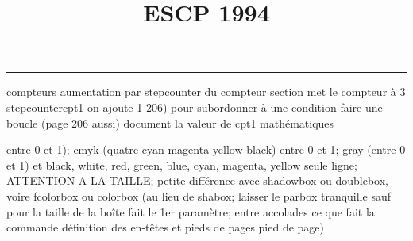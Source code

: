 \documentclass[11pt]{article}%
\title{\bf \vspace{-2cm} ESCP 1994} %
\author{} %
\date{} %
\renewcommand{\headrulewidth}{0pt}%
\renewcommand{\footrulewidth}{0.4pt}%
\begin{document}
\maketitle %
\vspace{-1.4cm}\hrule %
\thispagestyle{fancy}

\vspace*{.2cm}



compteurs%
aumentation par stepcounter du compteur section%
met le compteur à 3%
stepcounter{cpt1} on ajoute 1%
206) pour subordonner à une condition %
faire une boucle (page 206 aussi) %
document la valeur de cpt1 
mathématiques\newcommand{\ch}{\operatorname{ch}} 
\newcommand{\sh}{\operatorname{sh}}
\renewcommand{\tanh}{\operatorname{th}}
\renewcommand{\sinh}{\operatorname{sh}}
\renewcommand{\cosh}{\operatorname{ch}}
\newcommand{\argsh}{\operatorname{argsh}}
\newcommand{\argch}{\operatorname{argch}}
\newcommand{\argth}{\operatorname{argth}}
\newcommand{\ker}{\operatorname{Ker}}
\renewcommand{\im}{\operatorname{Im}}
\newcommand{\rg}{\operatorname{rg}}
\newcommand{\Id}{\operatorname{Id}}
\newcommand{\id}{\operatorname{id}}
\renewcommand{\leq}{\leq}
\renewcommand{\geq}{\geq }

entre 0 et 1); cmyk (quatre cyan magenta yellow black) entre 0 et 1;
gray (entre 0 et 1) et black, white, red, green, blue, cyan, magenta,
yellow%
seule ligne; ATTENTION A LA TAILLE; petite différence avec shadowbox ou
doublebox, voire fcolorbox ou colorbox (au lieu de shabox; laisser le
parbox tranquille sauf pour la taille de la boîte
\newcommand{\Tbox}[1]{\begin{center} \shabox{\parbox{0.6
\linewidth}{#1}} \end{center}} %
fait le 1er paramètre; entre accolades ce que fait la commande
définition des en-têtes et pieds de pages\pagestyle{fancy}
\chead{}
\rfoot[ \ \thepage]{\thepage}
\cfoot{}
\lfoot{}
\thispagestyle{fancy} %
pied de page)\renewcommand{\footrulewidth}{0.4pt}
\renewcommand{\headrulewidth}{0.4pt}
\end{document}

